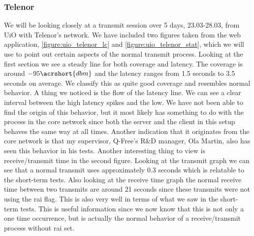 \documentclass[USenglish]{ifimaster}  %
\begin{document}
\subsubsection{Telenor}
We will be looking closely at a transmit session over 5 days, 23.03-28.03, from UiO with Telenor's network. We have included two figures taken from the web application, \vref{figure:uio_telenor_lc} and \vref{figure:uio_telenor_stat}, which we will use to point out certain aspects of the normal transmit process. Looking at the first section we see a steady line for both coverage and latency. The coverage is around ${-95 \acrshort{dbm}}$ and the latency ranges from 1.5 seconds to 3.5 seconds on average. We classify this as quite good coverage and resembles normal behavior. A thing we noticed is the flow of the latency line. We can see a clear interval between the high latency spikes and the low. We have not been able to find the origin of this behavior, but it most likely has something to do with the process in the core network since both the server and the client in this setup behaves the same way at all times. Another indication that it originates from the core network is that my supervisor, Q-Free's R\&D manager, Ola Martin, also has seen this behavior in his tests\cite{person:ola}. Another interesting thing to view is receive/transmit time in the second figure. Looking at the transmit graph we can see that a normal transmit uses approximately 0.3 seconds which is relatable to the short-term tests. Also looking at the receive time graph the normal receive time between two transmits are around 21 seconds since these transmits were not using the \acrshort{rai} flag. This is also very well in terms of what we saw in the short-term tests. This is useful information since we now know that this is not only a one time occurrence, but is actually the normal behavior of a receive/transmit process without \acrshort{rai} set.
\end{document}
